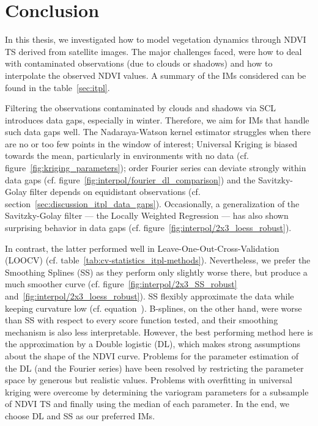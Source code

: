 \chapter{Conclusion}
\label{sec:Conclusion}


    In this thesis, we investigated how to model vegetation dynamics through NDVI {TS} derived from satellite images. The major challenges faced, were how to deal with contaminated observations (due to clouds or shadows) and how to interpolate the observed NDVI values. 
    A summary of the {{IM}}s considered can be found in the table~\ref{sec:itpl}. 
    
    Filtering the observations contaminated by clouds and shadows via SCL introduces data gaps, especially in winter. Therefore, we aim for {{IM}}s that handle such data gaps well. The Nadaraya-Watson kernel estimator struggles when there are no or too few points in the window of interest; Universal Kriging is biased towards the mean, particularly in environments with no data (cf. figure~\ref{fig:kriging_parameters});  order Fourier series can deviate strongly within data gaps (cf. figure~\ref{fig:interpol/fourier_dl_comparison}) and the Savitzky-Golay filter depends on equidistant observations (cf. section~\ref{sec:discussion_itpl_data_gaps}). Occasionally, a generalization of the Savitzky-Golay filter --- the Locally Weighted Regression --- has also shown surprising behavior in data gaps (cf. figure~\ref{fig:interpol/2x3_loess_robust}).
    
    In contrast, the latter performed well in Leave-One-Out-Cross-Validation (LOOCV) (cf. table~\ref{tab:cv-statistics_itpl-methods}). Nevertheless, we prefer the Smoothing Splines (SS) as they perform only slightly worse there, but produce a much smoother curve (cf. figure~\ref{fig:interpol/2x3_SS_robust} and~\ref{fig:interpol/2x3_loess_robust}). SS flexibly approximate the data while keeping curvature low (cf. equation~). B-splines, on the other hand, were worse than SS with respect to every score function tested, and their smoothing mechanism is also less interpretable. However, the best performing method here is the approximation by a Double logistic (DL), which makes strong assumptions about the shape of the NDVI curve. Problems for the parameter estimation of the DL (and the Fourier series) have been resolved by restricting the parameter space by generous but realistic values. Problems with overfitting in universal kriging were overcome by determining the variogram parameters for a subsample of NDVI {TS} and finally using the median of each parameter. 
    In the end, we choose DL and SS as our preferred {{IM}}s.




